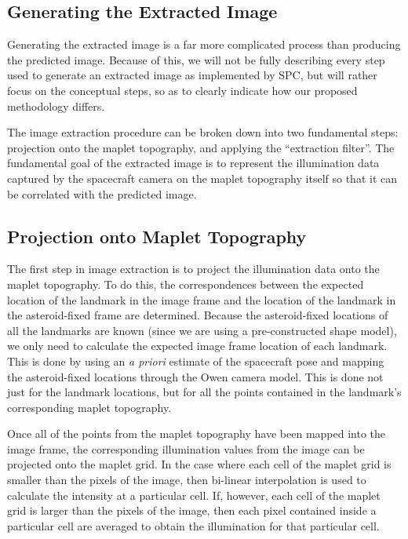 \documentclass{RPI-SIW}
\begin{document}
\subsection*{Generating the Extracted Image}
Generating the extracted image is a far more complicated process than producing the predicted image.  Because of this, we will not be fully describing every step used to generate an extracted image as implemented by SPC, but will rather focus on the conceptual steps, so as to clearly indicate how our proposed methodology differs.  

The image extraction procedure can be broken down into two fundamental steps: projection onto the maplet topography, and applying the ``extraction filter''.  The fundamental goal of the extracted image is to represent the illumination data captured by the spacecraft camera on the maplet topography itself so that it can be correlated with the predicted image.

\subsection*{Projection onto Maplet Topography}
The first step in image extraction is to project the illumination data onto the maplet topography.  To do this, the correspondences between the expected location of the landmark in the image frame and the location of the landmark in the asteroid-fixed frame are determined.  Because the asteroid-fixed locations of all the landmarks are known (since we are using a pre-constructed shape model), we only need to calculate the expected image frame location of each landmark.  This is done by using an \textit{a priori} estimate of the spacecraft pose and mapping the asteroid-fixed locations through the Owen camera model\cite{owen}.  This is done not just for the landmark locations, but for all the points contained in the landmark's corresponding maplet topography. 

Once all of the points from the maplet topography have been mapped into the image frame, the corresponding illumination values from the image can be projected onto the maplet grid.  In the case where each cell of the maplet grid is smaller than the pixels of the image, then bi-linear interpolation is used to calculate the intensity at a particular cell.  If, however, each cell of the maplet grid is larger than the pixels of the image, then each pixel contained inside a particular cell are averaged to obtain the illumination for that particular cell.
\end{document}
